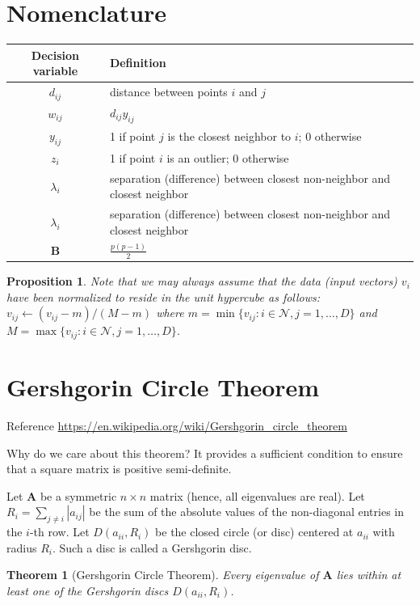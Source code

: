 \documentclass[]{article}
\renewcommand{\v}[1]{\ensuremath{\mathbf{#1}}}
\newcommand{\mc}{\mathcal}
\newtheorem{theorem}{Theorem}
\newtheorem{proposition}{Proposition}
\begin{document}
\newpage
\section{Nomenclature}
\begin{center}
\begin{tabular}{cl}
Decision variable & Definition \\
\hline
$d_{ij}$ & distance between points $i$ and $j$ \\
$w_{ij}$ & $d_{ij}y_{ij}$  \\
$y_{ij}$ & 1 if point $j$ is the closest neighbor to $i$; 0 otherwise  \\
$z_{i}$  & 1 if point $i$ is an outlier; 0 otherwise  \\
$\lambda_i$ & separation (difference) between closest non-neighbor and closest neighbor \\$\lambda_i$ & separation (difference) between closest non-neighbor and closest neighbor \\
$\v{B}$ & $\frac{p(p-1)}{2}$ \\ 
\end{tabular}
\end{center}

\begin{proposition}
Note that we may always assume that the data (input vectors) $v_{i}$ have been normalized to reside in the unit hypercube as follows: $v_{ij} \leftarrow (v_{ij} - m)/(M-m)$ where $m=\min\{v_{ij} : i \in \mc{N}, j=1,\dots,D \}$ and $M=\max\{v_{ij} : i \in \mc{N}, j=1,\dots,D \}$.
\end{proposition}


\newpage
\section{Gershgorin Circle Theorem}

Reference \url{https://en.wikipedia.org/wiki/Gershgorin_circle_theorem}

Why do we care about this theorem? It provides a sufficient condition to ensure that a square matrix is positive semi-definite.

Let $\v{A}$ be a symmetric $n \times n$ matrix (hence, all eigenvalues are real).
Let $R_{i}=\sum _{j\neq {i}} \left|a_{ij}\right|$ be the sum of the absolute values of the non-diagonal entries in the $i$-th row. Let $D(a_{ii},R_{i})$ be the closed circle (or disc) centered at $a_{ii}$ with radius $R_{i}$. Such a disc is called a Gershgorin disc.

\begin{theorem}[Gershgorin Circle Theorem]
Every eigenvalue of $\v{A}$ lies within at least one of the Gershgorin discs $D(a_{ii},R_{i})$.
\end{theorem}
\end{document}
